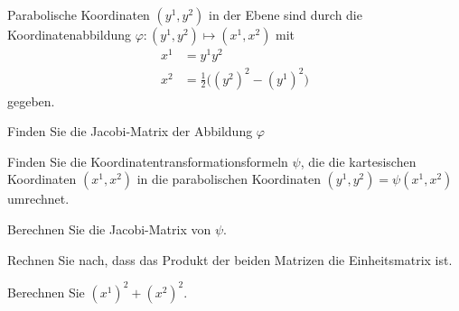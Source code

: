 Parabolische Koordinaten $(y^1,y^2)$ in der Ebene sind durch die
%
Koordinatenabbildung  $\varphi\colon (y^1,y^2)\mapsto (x^1,x^2)$ mit
\begin{align}
x^1 &= y^1y^2
\label{buch:202:eq1}
\\
x^2 &= \frac12\bigl((y^2)^2 - (y^1)^2\bigr)
\label{buch:202:eq2}
\end{align}
gegeben.
\begin{teilaufgaben}
\item 
Finden Sie die Jacobi-Matrix der Abbildung $\varphi$
\item
Finden Sie die Koordinatentransformationsformeln $\psi$, die die
kartesischen Koordinaten $(x^1,x^2)$ in die parabolischen Koordinaten
$(y^1,y^2)=\psi(x^1,x^2)$ umrechnet.
\item
Berechnen Sie die Jacobi-Matrix von $\psi$.
\item
Rechnen Sie nach, dass das Produkt der beiden Matrizen die Einheitsmatrix ist.
\end{teilaufgaben}

\begin{hinweis}
Berechnen Sie $(x^1)^2+(x^2)^2$.
\end{hinweis}

